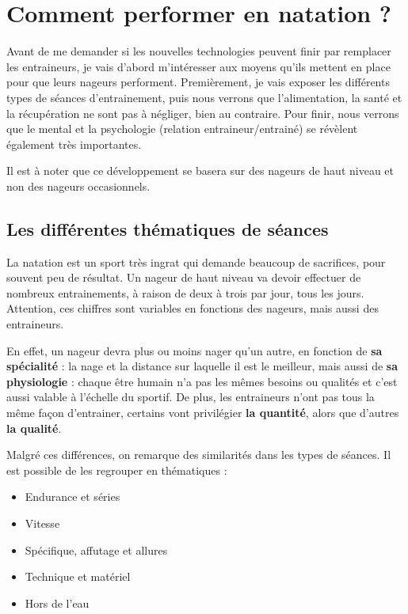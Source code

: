 \section{Comment performer en natation ?}

Avant de me demander si les nouvelles technologies peuvent finir par remplacer les entraineurs, je vais d'abord m'intéresser aux moyens qu'ils mettent en place pour que leurs nageurs performent. Premièrement, je vais exposer les différents types de séances d'entrainement, puis nous verrons que l'alimentation, la santé et la récupération ne sont pas à négliger, bien au contraire. Pour finir, nous verrons que le mental et la psychologie (relation entraineur/entrainé) se révèlent également très importantes.

Il est à noter que ce développement se basera sur des nageurs de haut niveau et non des nageurs occasionnels.

\subsection{Les différentes thématiques de séances}

La natation est un sport très ingrat qui demande beaucoup de sacrifices, pour souvent peu de résultat. Un nageur de haut niveau va devoir effectuer de nombreux entrainements, à raison de deux à trois par jour, tous les jours. Attention, ces chiffres sont variables en fonctions des nageurs, mais aussi des entraineurs.

\vspace{12pt}

En effet, un nageur devra plus ou moins nager qu'un autre, en fonction de \textbf{sa spécialité} : la nage et la distance sur laquelle il est le meilleur, mais aussi de \textbf{sa physiologie} : chaque être humain n'a pas les mêmes besoins ou qualités et c'est aussi valable à l'échelle du sportif. De plus, les entraineurs n'ont pas tous la même façon d'entrainer, certains vont privilégier \textbf{la quantité}, alors que d'autres \textbf{la qualité}.

\vspace{12pt}

Malgré ces différences, on remarque des similarités dans les types de séances. Il est possible de les regrouper en thématiques :
\begin{itemize}
 \item Endurance et séries
 \item Vitesse
 \item Spécifique, affutage et allures
 \item Technique et matériel
 \item Hors de l’eau
\end{itemize}


